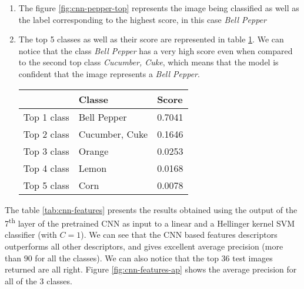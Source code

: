 \documentclass{article}
\begin{document}
\begin{enumerate}
\item The figure \ref{fig:cnn-pepper-top} represents the image being
  classified as well as the label corresponding to the highest score,
  in this case \emph{Bell Pepper}



\item The top 5 classes as well as their score are represented in
  table \ref{tab:top-5-pepper}. We can notice that the class \emph{Bell
    Pepper} has a very high score even when compared to the second top
  class \emph{Cucumber, Cuke}, which means that the model is confident
  that the image represents a \emph{Bell Pepper}.

  \begin{table}[h!]
    \centering
    \begin{tabular}{| l | l | l |}
      \hline
      & Classe & Score \\
      \hline
      Top 1 class & Bell Pepper    & 0.7041  \\
      Top 2 class & Cucumber, Cuke & 0.1646  \\
      Top 3 class & Orange         & 0.0253  \\
      Top 4 class & Lemon          & 0.0168 \\
      Top 5 class & Corn           & 0.0078 \\
      \hline
    \end{tabular}
     \label{tab:top-5-pepper}
  \end{table}


\end{enumerate}


The table \ref{tab:cnn-features} presents the results obtained using
the output of the 7\textsuperscript{th} layer of the pretrained CNN as
input to a linear and a Hellinger kernel SVM classifier (with
$C = 1$).  We can see that the CNN based features descriptors
outperforms all other descriptors, and gives excellent average
precision (more than $90$ for all the classes). We can also notice
that the top 36 test images returned are all right. Figure
\ref{fig:cnn-features-ap} shows the average precision for all of the 3
classes.
\end{document}

